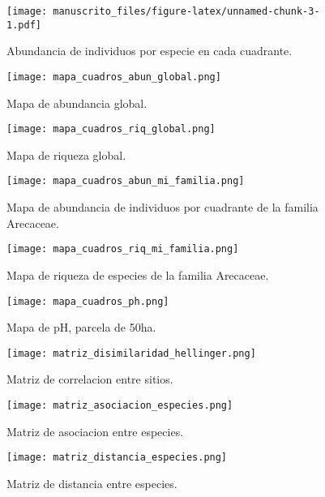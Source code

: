 \documentclass[11pt,]{article}
\begin{document}
\begin{figure}
\centering
\texttt{[image: manuscrito\_files/figure-latex/unnamed-chunk-3-1.pdf]}
\caption{\label{fig:abun_sp_q}Abundancia de individuos por especie en
cada cuadrante.}
\end{figure}

\begin{figure}
\centering
\texttt{[image: mapa\_cuadros\_abun\_global.png]}
\caption{Mapa de abundancia global.
\label{fig:mapa_cuadros_abun_global}}
\end{figure}

\begin{figure}
\centering
\texttt{[image: mapa\_cuadros\_riq\_global.png]}
\caption{Mapa de riqueza global. \label{fig:mapa_cuadros_riq_global}}
\end{figure}

\begin{figure}
\centering
\texttt{[image: mapa\_cuadros\_abun\_mi\_familia.png]}
\caption{Mapa de abundancia de individuos por cuadrante de la familia
Arecaceae. \label{fig:mapa_cuadros_abun_mi_familia}}
\end{figure}

\begin{figure}
\centering
\texttt{[image: mapa\_cuadros\_riq\_mi\_familia.png]}
\caption{Mapa de riqueza de especies de la familia Arecaceae.
\label{fig:mapa_cuadros_riq_mi_familia}}
\end{figure}

\begin{figure}
\centering
\texttt{[image: mapa\_cuadros\_ph.png]}
\caption{Mapa de pH, parcela de 50ha. \label{fig:mapa_cuadros_pH}}
\end{figure}

\begin{figure}
\centering
\texttt{[image: matriz\_disimilaridad\_hellinger.png]}
\caption{Matriz de correlacion entre sitios.
\label{fig:matriz_disimilaridad_hellinger}}
\end{figure}

\begin{figure}
\centering
\texttt{[image: matriz\_asociacion\_especies.png]}
\caption{Matriz de asociacion entre especies.
\label{fig:matriz_asociacion_especies}}
\end{figure}

\begin{figure}
\centering
\texttt{[image: matriz\_distancia\_especies.png]}
\caption{Matriz de distancia entre especies.
\label{fig:matriz_distancia_especies}}
\end{figure}
\end{document}
